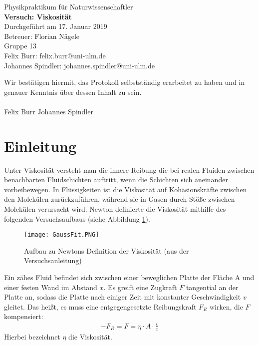 \documentclass{scrartcl}
\begin{document}
\begin{titlepage}
  \begin{center}
    \vspace*{1cm}
    \LARGE
    Physikpraktikum für Naturwissenschaftler \\
    \vspace*{1cm}
    \Huge
    \textbf{Versuch: Viskosität} \\
    \vspace*{0.3cm}
    \Large
    Durchgeführt am 17. Januar 2019 \\
    Betreuer: Florian Nägele \\
    \vspace*{2.5cm}
    Gruppe 13 \\
    Felix Burr: felix.burr@uni-ulm.de \\
    Johannes Spindler: johannes.spindler@uni-ulm.de \\
    \vfill 
  \end{center}
  Wir bestätigen hiermit, das Protokoll selbstständig erarbeitet zu haben und in genauer Kenntnis über dessen Inhalt zu sein. \\
  \vspace*{0.8cm}
  \\
  Felix Burr
  \hfill
  Johannes Spindler
\end{titlepage}
\pagebreak
\tableofcontents


\pagebreak

\section{Einleitung}
Unter Viskosität versteht man die innere Reibung die bei realen Fluiden  zwischen benachbarten Fluidschichten auftritt, wenn die Schichten sich aneinander vorbeibewegen. In Flüssigkeiten ist die Viskosität auf Kohäsionskräfte zwischen den Molekülen zurückzuführen, während sie in Gasen durch Stöße zwischen Molekülen verursacht wird. 
Newton definierte die Viskosität mithilfe des folgenden Versuchsaufbaus (siehe Abbildung \ref{fig:Definition}).

\begin{figure}[H]
  \centering
    \texttt{[image: GaussFit.PNG]}
  \caption{Aufbau zu Newtons Definition der Viskosität (aus der Versuchsanleitung)}
  \label{fig:Definition}
\end{figure}

Ein zähes Fluid befindet sich zwischen einer beweglichen Platte der Fläche A und einer festen Wand im Abstand $x$. Es greift eine Zugkraft $F$ tangential an der Platte an, sodass die Platte nach einiger Zeit mit konstanter Geschwindigkeit $v$ gleitet. Das heißt, es muss eine entgegengesetzte Reibungskraft $F_{R}$ wirken, die $F$ kompensiert:
\begin{align}
-F_{R} = F = \eta \cdot A \cdot \frac{v}{x}
\end{align}
Hierbei bezeichnet $\eta$ die Viskosität.
\end{document}
